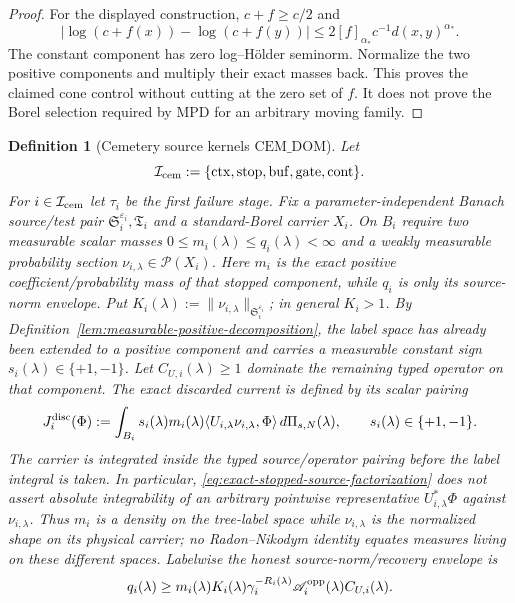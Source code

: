 \documentclass[11pt]{article}
\newtheorem{definition}[theorem]{Definition}
\begin{document}
\begin{proof}
For the displayed construction,
$c+f\ge c/2$ and
\[
 |\log(c+f(x))-\log(c+f(y))|
 \le 2[f]_{\alpha_*}c^{-1}d(x,y)^{\alpha_*}.
\]
The constant component has zero log--H\"older seminorm.  Normalize the two
positive components and multiply their exact masses back.  This proves the
claimed cone control without cutting at the zero set of $f$.  It does not
prove the Borel selection required by $\mathrm{MPD}$ for an arbitrary moving
family.
\end{proof}

\begin{definition}[Cemetery source kernels
$\mathrm{CEM\_DOM}$]
\label{def:cemetery-source-domination}
Let
\[
 \mathcal I_{\rm cem}:=
 \{\mathrm{ctx},\mathrm{stop},\mathrm{buf},
   \mathrm{gate},\mathrm{cont}\}.
\]
For $i\in\mathcal I_{\rm cem}$ let
$\tau_i$ be the first failure stage.  Fix a parameter-independent Banach
source/test pair
$\mathfrak S_i^{\varepsilon_i},\mathfrak T_i$ and a standard-Borel carrier
$X_i$.  On $B_i$ require two measurable scalar masses
$0\le m_i(\lambda)\le q_i(\lambda)<\infty$ and a weakly measurable
probability section $\nu_{i,\lambda}\in\mathcal P(X_i)$.  Here $m_i$ is the
exact positive coefficient/probability mass of that stopped component, while $q_i$ is
only its source-norm envelope.  Put
$K_i(\lambda):=\|\nu_{i,\lambda}\|_{\mathfrak S_i^{\varepsilon_i}}$; in
general $K_i>1$.  By Definition~\ref{lem:measurable-positive-decomposition}, the
label space has already been extended to a positive component and carries a
measurable constant sign $s_i(\lambda)\in\{+1,-1\}$.  Let
$C_{U,i}(\lambda)\ge1$ dominate the remaining typed operator on that
component.  The exact discarded current is
defined by its scalar pairing
\begin{equation}
\label{eq:exact-stopped-source-factorization}
 J_i^{\rm disc}(\Phi):=
 \int_{B_i}s_i(\lambda)m_i(\lambda)
   \langle U_{i,\lambda}\nu_{i,\lambda},\Phi\rangle
   \,d\Pi_{s,N}(\lambda),
 \qquad s_i(\lambda)\in\{+1,-1\}.
\end{equation}
The carrier is integrated inside the typed source/operator pairing before
the label integral is taken.  In particular,
\eqref{eq:exact-stopped-source-factorization} does not assert absolute
integrability of an arbitrary pointwise representative
$U_{i,\lambda}^{*}\Phi$ against $\nu_{i,\lambda}$.
Thus $m_i$ is a density on the tree-label space while $\nu_{i,\lambda}$ is
the normalized shape on its physical carrier; no Radon--Nikodym identity
equates measures living on these different spaces.  Labelwise the honest
source-norm/recovery envelope is
\begin{equation}
\label{eq:cemetery-fixed-source-norm}
 q_i(\lambda)\ge
 m_i(\lambda)K_i(\lambda)\gamma_i^{-R_i(\lambda)}
 \mathscr A_i^{\rm opp}(\lambda)C_{U,i}(\lambda).
\end{equation}


\end{definition}
\end{document}
